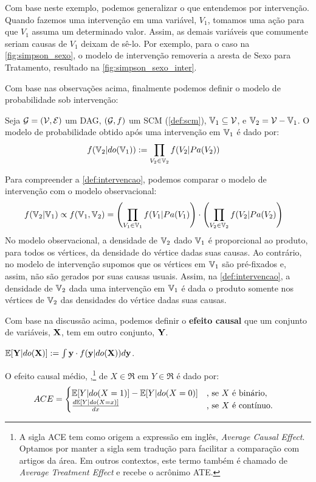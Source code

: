 Com base neste exemplo, podemos generalizar
o que entendemos por intervenção.
Quando fazemos uma intervenção em uma variável, $V_1$,
tomamos uma ação para que $V_1$ assuma um determinado valor.
Assim, as demais variáveis que comumente seriam 
causas de $V_1$ deixam de sê-lo.
Por exemplo, para o caso na \cref{fig:simpson_sexo},
o modelo de intervenção removeria a aresta de
Sexo para Tratamento, resultado na \cref{fig:simpson_sexo_inter}.

Com base nas observações acima, finalmente
podemos definir o modelo de probabilidade sob intervenção:

\begin{definition}
 \label{def:intervencao}
 Seja ${\mathcal G} = ({\mathcal V}, {\mathcal E})$ um DAG,
 $({\mathcal G},f)$ um SCM (\cref{def:scm}),
 ${\mathbb V}_1 \subseteq {\mathcal V}$, e 
 ${\mathbb V}_2 = {\mathcal V} - {\mathbb V}_1$. 
 O modelo de probabilidade obtido após
 uma intervenção em ${\mathbb V}_1$ é dado por:
 \begin{align*}
  f({\mathbb V}_2|do({\mathbb V}_1))
  &:= \prod_{V_2 \in {\mathbb V}_2} f(V_2|Pa(V_2))
 \end{align*}
\end{definition}
Para compreender a \cref{def:intervencao}, 
podemos comparar o modelo de intervenção com
o modelo observacional:
\begin{align*}
 f({\mathbb V}_2|{\mathbb V}_1)
 &\propto f({\mathbb V}_1,{\mathbb V}_2)
 = \left(\prod_{V_1 \in {\mathbb V}_1}f(V_1|Pa(V_1)\right) \cdot
   \left(\prod_{V_2 \in {\mathbb V}_2}f(V_2|Pa(V_2)\right)
\end{align*}
No modelo observacional, a densidade de ${\mathbb V}_2$ dado ${\mathbb V}_1$ é
proporcional ao produto, para todos os vértices,
da densidade do vértice dadas suas causas.
Ao contrário, no modelo de intervenção supomos que
os vértices em ${\mathbb V}_1$ são pré-fixados e, assim,
não são gerados por suas causas usuais.
Assim, na \cref{def:intervencao},
a densidade de ${\mathbb V}_2$ dada uma intervenção em ${\mathbb V}_1$ é
dada o produto somente nos vértices de ${\mathbb V}_2$
das densidades do vértice dadas suas causas.

Com base na discussão acima, podemos definir
o \textbf{efeito causal} que um conjunto de variáveis, ${\mathbf{X}}$,
tem em outro conjunto, ${\mathbf{Y}}$.

\begin{definition}
 \label{def:exp_inter}
 ${\mathbb E}[{\mathbf{Y}}|do({\mathbf{X}})] := \int {\mathbf{y}} \cdot f({\mathbf{y}}|do({\mathbf{X}})) d{\mathbf{y}}$.
\end{definition}

\begin{definition}
 \label{def:ace}
 O efeito causal médio, \ACE,\footnote{
 A sigla ACE tem como origem a expressão em inglês,
 \textit{Average Causal Effect}. Optamos por manter a sigla 
 sem tradução para facilitar a comparação com artigos da área.
 Em outros contextos, este termo também é chamado de 
 \textit{Average Treatment Effect} e recebe o acrônimo ATE.}
 de $X \in \Re$ em $Y \in \Re$ é dado por:
 \begin{align*}
  {ACE} &=
  \begin{cases}
   {\mathbb E}[Y|do(X=1)] - {\mathbb E}[Y|do(X=0)]
   & \text{, se $X$ é binário}, \\
   \frac{d{\mathbb E}[Y|do(X=x)]}{dx}
   & \text{, se $X$ é contínuo}.
  \end{cases}
 \end{align*}
\end{definition}

